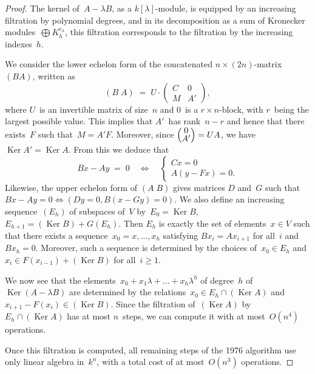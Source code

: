 \documentclass{lms}
\def\mat#1{\begin{pmatrix}#1\end{pmatrix}}
\def\smat{\def\arraystretch{.66}\mat}
\DeclareMathOperator\Ker{Ker}
\begin{document}
\begin{proof}
The kernel of~$A - λ B$, as a $k[λ]$-module,
is equipped by an increasing filtration by polynomial degrees,
and in its decomposition as a sum of Kronecker modules~$⨁ K_h^{e_h}$,
this filtration corresponds to the filtration by the increasing
indexes~$h$.

\medbreak

We consider the lower echelon form
of the concatenated $n × (2n)$-matrix $(B A)$, written as
\begin{equation}
(B \; A) \;=\; U · \mat{C & 0 \\ M & A'},
\end{equation}
where $U$~is an invertible matrix of size~$n$
and $0$~is a $r × n$-block, with $r$~being the largest possible value.
This implies that $A'$~has rank~$n-r$ and hence that
there exists~$F$ such that~$M = A' F$.
Moreover, since $\smat{0\\A'} = U A$, we have~$\Ker A' = \Ker A$.
From this we deduce that
\begin{equation}
B x - A y \;=\; 0 \quad ⇔ \quad
  \begin{cases} C x = 0 \\ A (y - F x) = 0.\end{cases}
\end{equation}
Likewise, the upper echelon form of $(A\;B)$
gives matrices $D$ and~$G$ such that
$B x - A y = 0 ⇔ (D y = 0, B (x - G y) = 0)$.
We also define an increasing sequence~$(E_h)$ of subspaces of~$V$
by~$E_0 = \Ker B$, $E_{h+1} = (\Ker B) + G(E_h)$.
Then $E_h$ is exactly the set of elements~$x ∈ V$ such that there exists
a sequence~$x_0 = x, …, x_h$ satisfying $B x_i = A x_{i+1}$ for all~$i$
and~$B x_h = 0$.
Moreover, such a sequence is determined by the choices
of~$x_0 ∈ E_h$ and~$x_{i} ∈ F(x_{i-1}) + (\Ker B)$ for all~$i ≥ 1$.

We now see that the elements~$x_0 + x_1 λ + … + x_h λ^h$
of degree~$h$ of~$\Ker(A - λ B)$
are determined by the relations~$x_0 ∈ E_{h} ∩ (\Ker A)$
and~$x_{i+1} - F (x_i) ∈ (\Ker B)$.
Since the filtration of~$(\Ker A)$ by~$E_{h} ∩ (\Ker A)$
has at most $n$~steps, we can compute it with at most~$O(n^4)$ operations.

Once this filtration is computed,
all remaining steps of the 1976 algorithm use only linear algebra in~$k^n$,
with a total cost of at most~$O(n^3)$ operations.
\end{proof}
\end{document}
